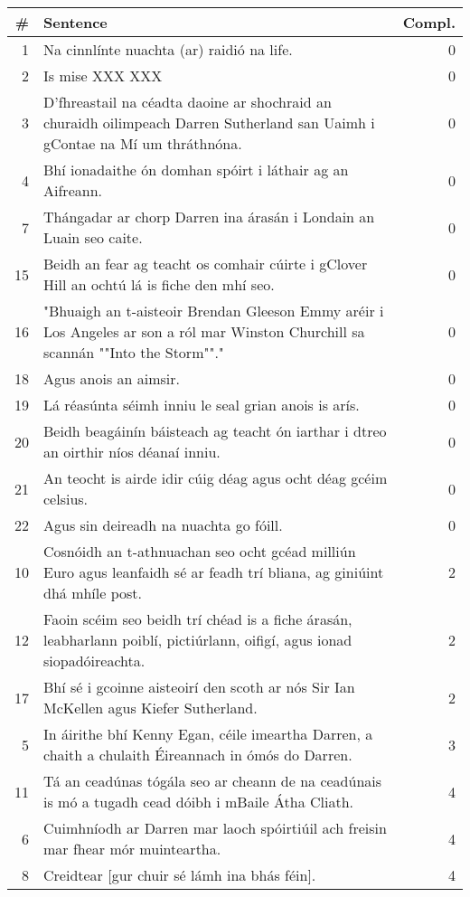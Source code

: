 \documentclass[output=paper,colorlinks,citecolor=brown]{langscibook}
\begin{document}
\begin{table}[!htbp]
\small
\begin{tabularx}{\textwidth}{rXr}
\lsptoprule
\# & Sentence & Compl. \\
\midrule
1& Na cinnlínte nuachta (ar) raidió na life.& 0\\
2& Is mise XXX XXX& 0\\
3& D'fhreastail na céadta daoine ar shochraid an churaidh oilimpeach Darren Sutherland san Uaimh i gContae na Mí um thráthnóna.& 0\\
4& Bhí ionadaithe ón domhan spóirt i láthair ag an Aifreann.& 0\\
7& Thángadar ar chorp Darren ina árasán i Londain an Luain seo caite.& 0\\
15& Beidh an fear ag teacht os comhair cúirte i gClover Hill an ochtú lá is fiche den mhí seo.& 0\\
16& "Bhuaigh an t-aisteoir Brendan Gleeson Emmy aréir i Los Angeles ar son a ról mar Winston Churchill sa scannán ""Into the Storm""."& 0\\
18& Agus anois an aimsir.& 0\\
19& Lá réasúnta séimh inniu le seal grian anois is arís.& 0\\
20& Beidh beagáinín báisteach ag teacht ón iarthar i dtreo an oirthir níos déanaí inniu.& 0\\
21& An teocht is airde idir cúig déag agus ocht déag gcéim celsius.& 0\\
22& Agus sin deireadh na nuachta go fóill.& 0\\
10& Cosnóidh an t-athnuachan seo ocht gcéad milliún Euro agus leanfaidh sé ar feadh trí bliana, ag giniúint dhá mhíle post.& 2\\
12& Faoin scéim seo beidh trí chéad is a fiche árasán, leabharlann poiblí, pictiúrlann, oifigí, agus ionad siopadóireachta.& 2\\
17& Bhí sé i gcoinne aisteoirí den scoth ar nós Sir Ian McKellen agus Kiefer Sutherland.& 2\\
5& In áirithe bhí Kenny Egan, céile imeartha Darren, {a chaith a chulaith Éireannach in ómós do Darren}.& 3\\
11& Tá an ceadúnas tógála seo ar cheann de na ceadúnais is mó {a tugadh cead dóibh i mBaile Átha Cliath}.& 4\\
6& Cuimhníodh ar Darren mar laoch spóirtiúil ach freisin mar fhear mór muinteartha.& 4\\
8& Creidtear [gur chuir sé lámh ina bhás féin].& 4\\

\end{tabularx}
\end{table}
\end{document}

